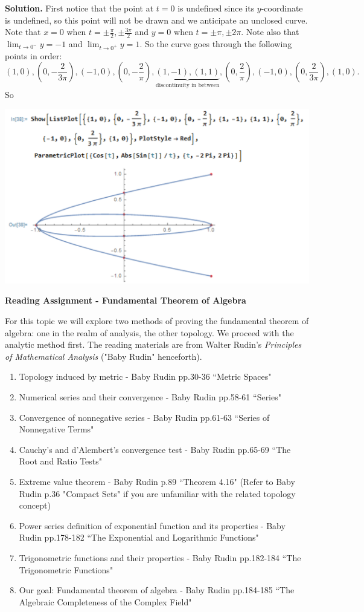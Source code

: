 \documentclass[10pt]{article}
\begin{document}
\textbf{Solution.} First notice that the point at $t=0$ is undefined since its $y$-coordinate is undefined, so this point will not be drawn and we anticipate an unclosed curve. Note that $x=0$ when $t=\pm\frac{\pi}{2},\pm\frac{3\pi}{2}$ and $y=0$ when $t=\pm\pi,\pm2\pi$. Note also that $\lim_{t\to0^-}y=-1$ and $\lim_{t\to0^+}y=1$. So the curve goes through the following points in order: $$(1,0),(0,-\frac{2}{3\pi}),(-1,0),(0,-\frac{2}{\pi}),\underbrace{(1,-1),(1,1)}_{\text{discontinuity in between}},(0,\frac{2}{\pi}),(-1,0),(0,\frac{2}{3\pi}),(1,0).$$ So 
\begin{center}
\includegraphics[width=0.8\linewidth]{GraphingProblem9}
\end{center}



\newpage
\begin{center}\textbf{\Large Reading Assignment - Fundamental Theorem of Algebra}\end{center}

For this topic we will explore two methods of proving the fundamental theorem of algebra: one in the realm of analysis, the other topology. We proceed with the analytic method first. The reading materials are from Walter Rudin's \textit{Principles of Mathematical Analysis} ("Baby Rudin" henceforth).

\begin{enumerate}[label=\arabic*.]
\item Topology induced by metric - Baby Rudin pp.30-36 ``Metric Spaces"
\item Numerical series and their convergence - Baby Rudin pp.58-61 ``Series"
\item Convergence of nonnegative series - Baby Rudin pp.61-63 ``Series of Nonnegative Terms"
\item Cauchy's and d'Alembert's convergence test - Baby Rudin pp.65-69 ``The Root and Ratio Tests"
\item Extreme value theorem - Baby Rudin p.89 ``Theorem 4.16" (Refer to Baby Rudin p.36 "Compact Sets" if you are unfamiliar with the related topology concept)
\item Power series definition of exponential function and its properties - Baby Rudin pp.178-182 ``The Exponential and Logarithmic Functions"
\item Trigonometric functions and their properties - Baby Rudin pp.182-184 ``The Trigonometric Functions"
\item Our goal: Fundamental theorem of algebra - Baby Rudin pp.184-185 ``The Algebraic Completeness of the Complex Field"
\end{enumerate}
\end{document}
